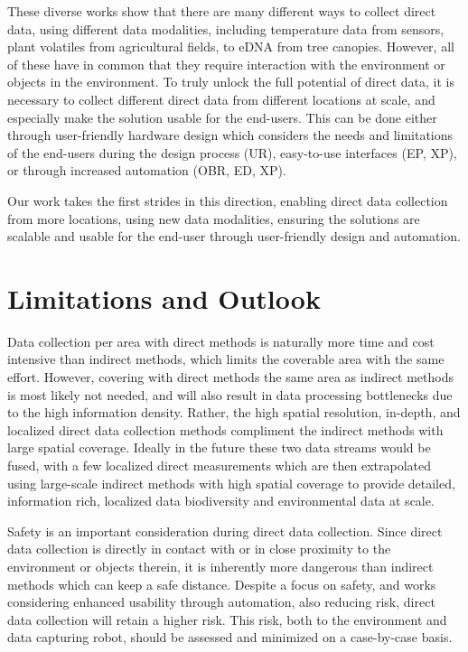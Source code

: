 These diverse works show that there are many different ways to collect direct data, using different data modalities, including  temperature data from sensors, plant volatiles from agricultural fields, to eDNA from tree canopies. However, all of these have in common that they require interaction with the environment or objects in the environment. To truly unlock the full potential of direct data,  it is necessary to collect different direct data from  different locations at scale, and  especially make the solution usable for the end-users. 
This can be done either through user-friendly hardware design which considers the needs and limitations of the end-users during the design process (UR), easy-to-use interfaces (EP, XP), or through increased automation (OBR, ED, XP). 

Our work takes the first strides in this direction, enabling direct data collection from more locations, using new data modalities, ensuring the solutions are scalable and usable for the end-user through user-friendly design and automation.


\section{Limitations and Outlook} %

Data collection per area with direct methods is naturally more time and cost intensive than indirect methods, which limits the coverable area with the same effort. 
However, covering with direct methods the same area as indirect methods is most likely not needed, and will also result in data processing bottlenecks due to the  high information density. Rather, the high spatial resolution, in-depth, and localized direct data collection methods compliment the indirect methods with large spatial coverage. Ideally in the future these two data streams would be fused, with a few localized direct measurements which are then extrapolated using large-scale indirect methods with high spatial coverage to provide detailed, information rich, localized data biodiversity and environmental data at scale.

Safety is an important consideration during direct data collection. Since direct data collection is directly in contact with or in close proximity to the environment or objects therein, it is inherently more dangerous than indirect methods which can keep a safe distance. Despite a focus on safety, and works considering enhanced usability through automation, also reducing risk, direct data collection will retain a higher risk. This risk, both to the environment and data capturing robot, should be assessed and minimized on a case-by-case basis.

